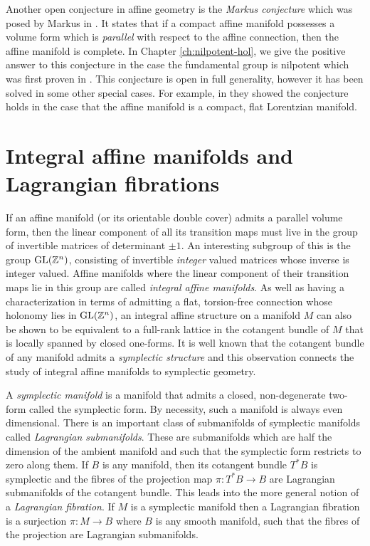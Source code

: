 Another open conjecture in affine geometry is the \emph{Markus conjecture}
which was posed by Markus in \cite{markus1963cosmological}. It states that if a
compact affine manifold possesses a volume form which is \emph{parallel} with
respect to the affine connection, then the affine manifold is complete. In
Chapter \ref{ch:nilpotent-hol}, we give the positive answer to this conjecture
in the case the fundamental group is nilpotent which was first proven in
\cite{nilpotent-holonomy}. This conjecture is open in full generality, however
it has been solved in some other special cases. For example, in
\cite{Carriere1989} they showed the conjecture holds in the case that the
affine manifold is a compact, flat Lorentzian manifold.

\section*{Integral affine manifolds and Lagrangian fibrations}

If an affine manifold (or its orientable double cover) admits a parallel volume
form, then the linear component of all its transition maps must live in the
group of invertible matrices of determinant $\pm 1$. An interesting subgroup of
this is the group $\mathrm{GL}(\mathbb{Z}^n)$, consisting of invertible \emph{integer}
valued matrices whose inverse is integer valued. Affine manifolds where the
linear component of their transition maps lie in this group are called
\emph{integral affine manifolds}. As well as having a characterization in terms
of admitting a flat, torsion-free connection whose holonomy lies in
$\mathrm{GL}(\mathbb{Z}^n)$, an integral affine structure on a manifold $M$ can also be
shown to be equivalent to a full-rank lattice in the cotangent bundle of $M$
that is locally spanned by closed one-forms. It is well known that the
cotangent bundle of any manifold admits a \emph{symplectic structure} and this
observation connects the study of integral affine manifolds to symplectic
geometry.

A \emph{symplectic manifold} is a manifold that admits a closed, non-degenerate
two-form called the symplectic form. By necessity, such a manifold is always
even dimensional. There is an important class of submanifolds of symplectic
manifolds called \emph{Lagrangian submanifolds}. These are submanifolds which
are half the dimension of the ambient manifold and such that the symplectic
form restricts to zero along them. If $B$ is any manifold, then its cotangent
bundle $T^*B$ is symplectic and the fibres of the projection map $\pi: T^*B \to
    B$ are Lagrangian submanifolds of the cotangent bundle. This leads into the
more general notion of a \emph{Lagrangian fibration}. If $M$ is a symplectic
manifold then a Lagrangian fibration is a surjection $\pi: M \to B$ where $B$
is any smooth manifold, such that the fibres of the projection are Lagrangian
submanifolds.


